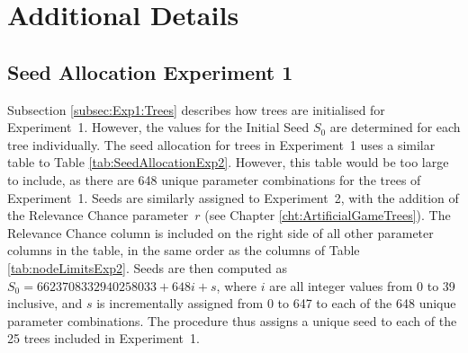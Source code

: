 \chapter{Additional Details}
\section{Seed Allocation Experiment 1}
\label{sec:SeedAllocationExp1}
Subsection \ref{subsec:Exp1:Trees} describes how trees are initialised for Experiment~1. However, the values for the Initial Seed $S_0$ are determined for each tree individually. The seed allocation for trees in Experiment~1 uses a similar table to Table \ref{tab:SeedAllocationExp2}. However, this table would be too large to include, as there are 648 unique parameter combinations for the trees of Experiment~1.
Seeds are similarly assigned to Experiment~2, with the addition of the Relevance Chance parameter~$r$ (see Chapter \ref{cht:ArtificialGameTrees}).
The Relevance Chance column is included on the right side of all other parameter columns in the table, in the same order as the columns of Table \ref{tab:nodeLimitsExp2}. Seeds are then computed as $S_0 = 6623708332940258033 + 648i + s$, where $i$ are all integer values from 0 to 39 inclusive, and $s$ is incrementally assigned from 0 to 647 to each of the 648 unique parameter combinations.
The procedure thus assigns a unique seed to each of the 25 trees included in Experiment~1.

\FloatBarrier
